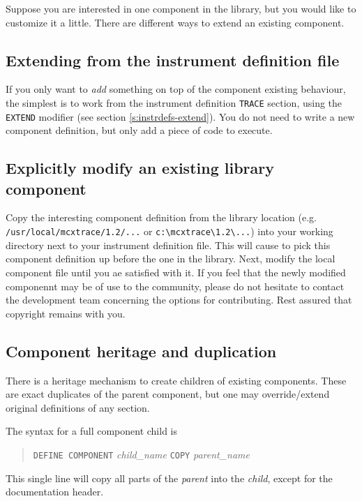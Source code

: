 Suppose you are interested in one component in the \MCX library, but you would like to customize it a little. There are different ways to extend an existing component.

\subsection{Extending from the instrument definition file}

If you only want to \emph{add} something on top of the component existing
behaviour, the simplest is to work from the instrument definition
\texttt{TRACE} section, using the \texttt{EXTEND} modifier (see section
\ref{s:instrdefs-extend}). You do not need to write a new component
definition, but only add a piece of code to execute.

\subsection{Explicitly modify an existing library component}
Copy the interesting component definition from the \MCX library location (e.g. \verb+/usr/local/mcxtrace/1.2/...+ or \verb+c:\mcxtrace\1.2\...+) into your working directory next to
your instrument definition file. 
This will cause \MCX to pick this component definition up before the one in the library.
Next, modify the local component file until you ae satisfied with it. If you feel that the newly modified componennt may be of use to the \MCX community, please do not hesitate to contact the
development team concerning the options for contributing. Rest assured that copyright remains with you. 

\subsection{Component heritage and duplication}

There is a heritage mechanism to create children of existing components. These are exact duplicates of the parent component, but one may override/extend original definitions of any section.

The syntax for a full component child is
\begin{quote}
  \texttt{DEFINE COMPONENT} \textit{child\_name} \texttt{COPY} \textit{parent\_name}
\end{quote}
This single line will copy all parts of the \textit{parent} into the \textit{child}, except for the documentation header.

